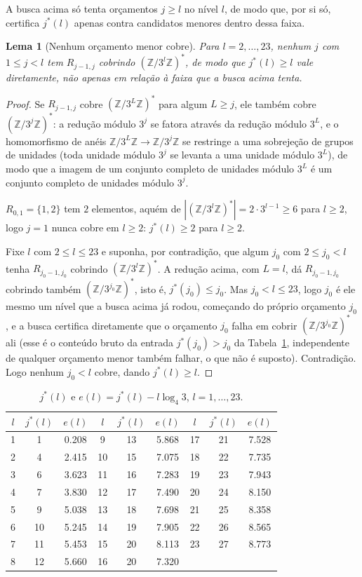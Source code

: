 \documentclass[11pt]{amsart}
\theoremstyle{plain}
\newtheorem{lemma}[theorem]{Lema}
\theoremstyle{definition}
\theoremstyle{remark}
\newcommand{\Z}{\mathbb{Z}}
\begin{document}
A busca acima só tenta orçamentos $j\ge l$ no nível $l$, de modo que, por si só, certifica $j^*(l)$
apenas contra candidatos menores dentro dessa faixa.

\begin{lemma}[Nenhum orçamento menor cobre]
\label{lem:nosmaller}
Para $l=2,\dots,23$, nenhum $j$ com $1\le j<l$ tem $R_{j-1,j}$ cobrindo $(\Z/3^l\Z)^*$, de modo que
$j^*(l)\ge l$ vale diretamente, não apenas em relação à faixa que a busca acima tenta.
\end{lemma}

\begin{proof}
Se $R_{j-1,j}$ cobre $(\Z/3^L\Z)^*$ para algum $L\ge j$, ele também cobre $(\Z/3^j\Z)^*$: a redução
módulo $3^j$ se fatora através da redução módulo $3^L$, e o homomorfismo de anéis
$\Z/3^L\Z\to\Z/3^j\Z$ se restringe a uma sobrejeção de grupos de unidades (toda unidade módulo $3^j$
se levanta a uma unidade módulo $3^L$), de modo que a imagem de um conjunto completo de unidades
módulo $3^L$ é um conjunto completo de unidades módulo $3^j$.

$R_{0,1}=\{1,2\}$ tem $2$ elementos, aquém de $|(\Z/3^l\Z)^*|=2\cdot3^{l-1}\ge6$ para $l\ge2$, logo
$j=1$ nunca cobre em $l\ge2$: $j^*(l)\ge2$ para $l\ge2$.

Fixe $l$ com $2\le l\le23$ e suponha, por contradição, que algum $j_0$ com $2\le j_0<l$ tenha
$R_{j_0-1,j_0}$ cobrindo $(\Z/3^l\Z)^*$. A redução acima, com $L=l$, dá $R_{j_0-1,j_0}$ cobrindo
também $(\Z/3^{j_0}\Z)^*$, isto é, $j^*(j_0)\le j_0$. Mas $j_0<l\le23$, logo $j_0$ é ele mesmo um
nível que a busca acima já rodou, começando do próprio orçamento $j_0$, e a busca certifica
diretamente que o orçamento $j_0$ falha em cobrir $(\Z/3^{j_0}\Z)^*$ ali (esse é o conteúdo bruto da
entrada $j^*(j_0)>j_0$ da Tabela~\ref{tab:jstar}, independente de qualquer orçamento menor também
falhar, o que não é suposto). Contradição. Logo nenhum $j_0<l$ cobre, dando $j^*(l)\ge l$.
\end{proof}

\begin{table}[h]
\centering
\begin{tabular}{c|c|c||c|c|c||c|c|c}
$l$ & $j^*(l)$ & $e(l)$ & $l$ & $j^*(l)$ & $e(l)$ & $l$ & $j^*(l)$ & $e(l)$ \\ \hline
1 & 1 & 0.208 & 9 & 13 & 5.868 & 17 & 21 & 7.528 \\
2 & 4 & 2.415 & 10 & 15 & 7.075 & 18 & 22 & 7.735 \\
3 & 6 & 3.623 & 11 & 16 & 7.283 & 19 & 23 & 7.943 \\
4 & 7 & 3.830 & 12 & 17 & 7.490 & 20 & 24 & 8.150 \\
5 & 9 & 5.038 & 13 & 18 & 7.698 & 21 & 25 & 8.358 \\
6 & 10 & 5.245 & 14 & 19 & 7.905 & 22 & 26 & 8.565 \\
7 & 11 & 5.453 & 15 & 20 & 8.113 & 23 & 27 & 8.773 \\
8 & 12 & 5.660 & 16 & 20 & 7.320 & & & \\
\end{tabular}
\caption{$j^*(l)$ e $e(l) = j^*(l) - l\log_4 3$, $l=1,\dots,23$.}
\label{tab:jstar}
\end{table}
\end{document}
